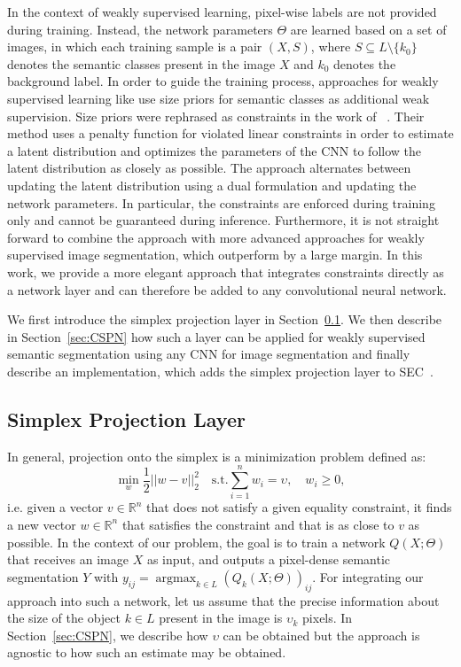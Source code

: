 \documentclass{bmvc2k}
\DeclareMathOperator*{\argmax}{\mathrm{argmax}}
\DeclareMathOperator*{\minw}{\mathrm{min}}
\newcommand{\R}{\mathbb{R}}
\begin{document}
In the context of weakly supervised learning, pixel-wise labels are not provided during training. Instead, the network parameters $\Theta$ are learned based on a set of images, in which each training sample is a pair $(X, S)$, where $S\subseteq L\setminus \{k_0\}$ denotes the semantic classes present in the image $X$ and $k_0$ denotes the background label. In order to guide the training process, approaches for weakly supervised learning like \cite{chen2018deeplab} use size priors for semantic classes as additional weak supervision. Size priors were rephrased as constraints in the work of ~\cite{pathak2015constrained}. Their method uses a penalty function for violated linear constraints in order to estimate a latent distribution and optimizes the parameters of the CNN to follow the latent distribution as closely as possible. The approach alternates between updating the latent distribution using a dual formulation and updating the network parameters. In particular, the constraints are enforced during training only and cannot be guaranteed during inference. Furthermore, it is not straight forward to combine the approach with more advanced approaches for weakly supervised image segmentation, which outperform \cite{pathak2015constrained} by a large margin. In this work, we provide a more elegant approach that integrates constraints directly as a network layer and can therefore be added to any convolutional neural network.         

We first introduce the simplex projection layer in Section~\ref{sec:layer}. We then describe in Section~\ref{sec:CSPN} how such a layer can be applied for weakly supervised semantic segmentation using any CNN for image segmentation and finally describe an implementation, which adds the simplex projection layer to SEC~\cite{kolesnikov2016seed}. 

\subsection{Simplex Projection Layer}\label{sec:layer}
In general, projection onto the simplex is a minimization problem defined as:
\begin{equation}\label{eq:simplex_project}
\minw_w \frac{1}{2}||w-v||_2^2 \quad \textrm{s.t.} \sum_{i=1}^{n}w_i=\upsilon, \quad w_i\geq0,
\end{equation}
i.e. given a vector $v\in\R^n$ that does not satisfy a given equality constraint, it finds a new vector $w\in\R^n$ that satisfies the constraint and that is as close to $v$ as possible.
In the context of our problem, the goal is to train a network $Q(X;\Theta)$ that receives an image $X$ as input, and outputs a pixel-dense semantic segmentation $Y$ with $y_{ij}=\argmax_{k\in L} (Q_k(X;\Theta))_{ij}$. For integrating our approach into such a network, let us assume that the precise information about the size of the object $k\in L$ present in the image is $\upsilon_k$ pixels. In Section~\ref{sec:CSPN}, we describe how $\upsilon$ can be obtained but the approach is agnostic to how such an estimate may be obtained. 
\end{document}
